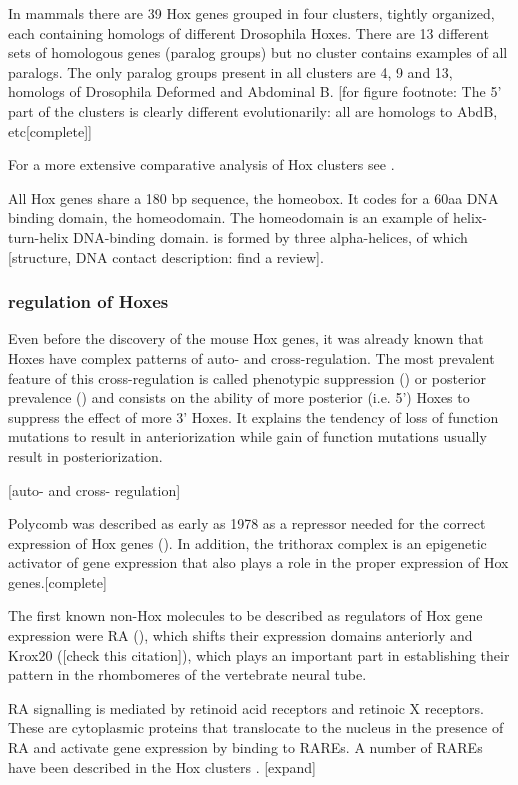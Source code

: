 In mammals there are 39 Hox genes grouped in four clusters, tightly organized, each containing homologs of different Drosophila Hoxes. There are 13 different sets of homologous genes (paralog groups) but no cluster contains examples of all paralogs. The only paralog groups present in all clusters are 4, 9 and 13, homologs of Drosophila Deformed and Abdominal B. [for figure footnote: The 5' part of the clusters is clearly different evolutionarily: all are homologs to AbdB, etc[complete]] 

For a more extensive comparative analysis of Hox clusters see \cite{Duboule2007}.

All Hox genes share a 180 bp sequence, the homeobox. It codes for a 60aa DNA binding domain, the homeodomain. The homeodomain is an example of helix-turn-helix DNA-binding domain. is formed by three alpha-helices, of which [structure, DNA contact description: find a review]. 

\subsubsection{regulation of Hoxes}

Even before the discovery of the mouse Hox genes, it was already known that Hoxes have complex patterns of auto- and cross-regulation. The most prevalent feature of this cross-regulation is called phenotypic suppression (\cite{Gonzalez-Reyes1990}) or posterior prevalence (\cite{Lufkin1991}) and consists on the ability of more posterior (i.e. 5') Hoxes to suppress the effect of more 3' Hoxes. It explains the tendency of loss of function mutations to result in anteriorization while gain of function mutations usually result in posteriorization.

[auto- and cross- regulation]

Polycomb was described as early as 1978 as a repressor needed for the correct expression of Hox genes (\cite{Lewis1978}). In addition, the trithorax complex is an epigenetic activator of gene expression that also plays a role in the proper expression of Hox genes.[complete]

The first known non-Hox molecules to be described as regulators of Hox gene expression were \ac{RA} (\cite{Simeone1990}), which shifts their expression domains anteriorly and Krox20 (\cite{Swiatek1993}[check this citation]), which plays an important part in establishing their pattern in the rhombomeres of the vertebrate neural tube.

\ac{RA} signalling is mediated by retinoid acid receptors and retinoic X receptors. These are cytoplasmic proteins that translocate to the nucleus in the presence of \ac{RA} and activate gene expression by binding to \acp{RARE}. A number of \acp{RARE} have been described in the Hox clusters \cite{refs}. [expand]

